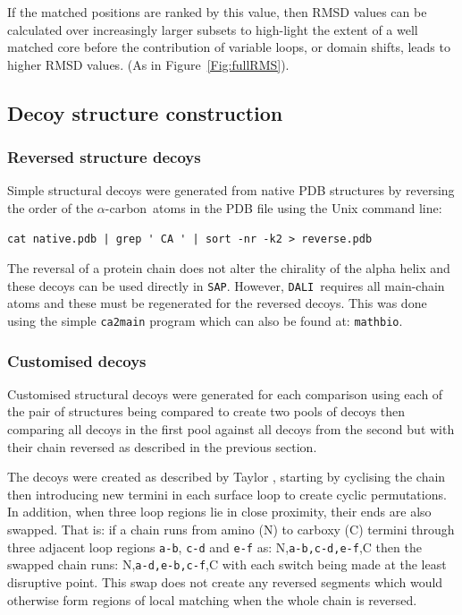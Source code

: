 \documentclass[preprint,12pt]{elsarticle}
\newcommand{\CA}{$\alpha$-carbon}
\newcommand{\SAP}{{\tt SAP}}
\newcommand{\DALI}{{\tt DALI}}
\newcommand{\Fig}[1]{Figure~\ref{Fig:#1}}
\begin{document}
If the matched positions are ranked by this value, then RMSD values can be calculated over
increasingly larger subsets to high-light the extent of a well matched core before
the contribution of variable loops, or domain shifts, leads to higher RMSD values.
(As in \Fig{fullRMS}).

\subsection{Decoy structure construction}

\subsubsection{Reversed structure decoys}

Simple structural decoys were generated from native PDB structures by reversing the order
of the \CA\ atoms in the PDB file using the Unix command line:
\begin{verbatim}
cat native.pdb | grep ' CA ' | sort -nr -k2 > reverse.pdb
\end{verbatim}
The reversal of a protein chain does not alter the chirality of the alpha helix and
these decoys can be used directly in \SAP.   However, \DALI\ requires all main-chain atoms
and these must be regenerated for the reversed decoys.   This was done using the simple
{\tt ca2main} program which can also be found at: {\tt  mathbio}.

\subsubsection{Customised decoys}

Customised structural decoys were generated for each comparison using each of the
pair of structures being compared to create two pools of decoys then comparing all
decoys in the first pool against all decoys from the second but with their chain
reversed as described in the previous section.

The decoys were created as described by Taylor \cite{TaylorWR06a}, starting by cyclising the
chain then introducing new termini in each surface loop to create cyclic permutations.
In addition, when three loop regions lie in close proximity, their ends are also
swapped.   That is: if a chain runs from amino (N) to carboxy (C) termini through
three adjacent loop regions {\tt a-b}, {\tt c-d} and {\tt e-f} as: N,{\tt a-b,c-d,e-f},C
then the swapped chain runs: N,{\tt a-d,e-b,c-f},C with each switch being made at the
least disruptive point.   This swap does not create any reversed segments which would
otherwise form regions of local matching when the whole chain is reversed.
\end{document}
